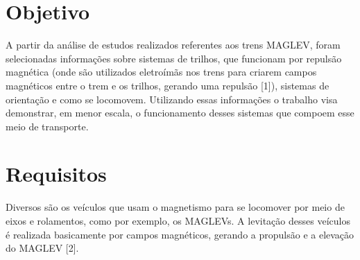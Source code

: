 \documentclass[
	12pt,				%
	openany,			%
	a4paper,			%
	english,			%
	spanish,			%
	brazil,				%
	]{abntex2}
\begin{document}

\frenchspacing 


\imprimircapa

\imprimirfolhaderosto


\listoffigures*
\cleardoublepage

\tableofcontents*
\cleardoublepage


\textual

\chapter{Objetivo}

A partir da análise de estudos realizados referentes aos trens MAGLEV, foram selecionadas informações sobre sistemas de trilhos, que funcionam por repulsão magnética (onde são utilizados eletroímãs nos trens para criarem campos magnéticos entre o trem e os trilhos, gerando uma repulsão [1]), sistemas de orientação e como se locomovem. Utilizando essas informações o trabalho visa demonstrar, em menor escala, o funcionamento desses sistemas que compoem esse meio de transporte.

\chapter{Requisitos}
Diversos são os veículos que usam o magnetismo para se locomover por meio de eixos e rolamentos, como por exemplo, os MAGLEVs. A levitação desses veículos é realizada basicamente por campos magnéticos, gerando a propulsão e a elevação do MAGLEV [2].
\end{document}
